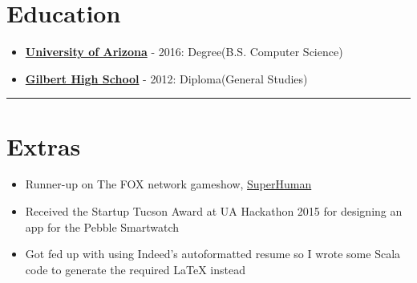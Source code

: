 \documentclass{article}
\begin{document}
\raggedright{\section*{Education}}

\begin{itemize}
\item \href{https://www.cs.arizona.edu/}{\textbf{University of Arizona}} - 2016: Degree(B.S. Computer Science)
\item \href{https://www.gilbertschools.net/gilberthigh}{\textbf{Gilbert High School}} - 2012: Diploma(General Studies)
\end{itemize}
\noindent\rule{\linewidth}{1pt}

\raggedright{\section*{Extras}}

\begin{itemize}
\item Runner-up on The FOX network gameshow, \href{https://www.youtube.com/watch?v=t65mzlOCDF8}{SuperHuman}
\item Received the Startup Tucson Award at UA Hackathon 2015 for designing an app for the Pebble Smartwatch
\item Got fed up with using Indeed's autoformatted resume so I wrote some Scala code to generate the required LaTeX instead
\end{itemize}
\vspace*{\fill}

\end{document}
